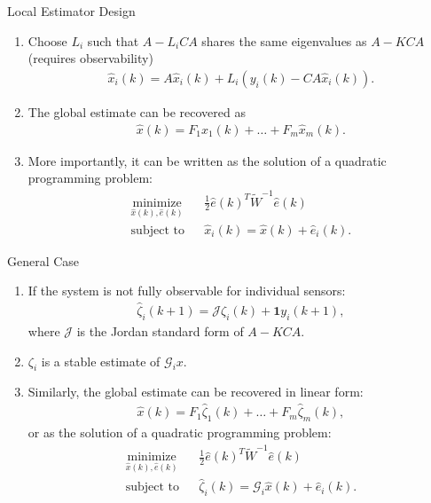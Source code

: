\documentclass[10pt]{beamer}
\begin{document}
\begin{frame}{Local Estimator Design}
  \begin{enumerate}
  \item  Choose $L_i$ such that $A-L_iCA$ shares the same eigenvalues as $A-KCA$ (requires observability)
    \begin{align*}
      \hat x_i(k) = A \hat x_i(k) + L_i (y_i(k)-CA\hat x_i(k)).
    \end{align*}  
  \item The global estimate can be recovered as
    \begin{align*}
      \hat x(k) = F_1\hat x_1(k)+\dots+F_m\hat x_m(k).
    \end{align*}
  \item More importantly, it can be written as the solution of a quadratic programming problem:
    \begin{align*}
      &\mathop{\textrm{minimize}}\limits_{\hat x(k),\hat e(k)}&
      & \frac{1}{2}\hat e(k)^T \tilde W^{-1} \hat e(k)\\
      &\textrm{subject to} &
      &\hat x_i(k)  =  \hat x(k) + \hat e_i(k).&
    \end{align*}
  \end{enumerate}
\end{frame}

\begin{frame}{General Case}
  \begin{enumerate}
  \item If the system is not fully observable for individual sensors:
    \begin{align*}
      \hat \zeta_i(k+1) = \mathcal J \zeta_i(k) + \mathbf 1 y_i(k+1),
    \end{align*}  
    where $\mathcal J$ is the Jordan standard form of $A-KCA$.
  \item $\zeta_i$ is a stable estimate of $\mathcal G_i x$. 
  \item Similarly, the global estimate can be recovered in linear form:
    \begin{align*}
      \hat x(k) = F_1\hat \zeta_1(k)+\dots+F_m\hat \zeta_m(k),
    \end{align*}
    or as the solution of a quadratic programming problem:
    \begin{align*}
      &\mathop{\textrm{minimize}}\limits_{\hat x(k),\hat e(k)}&
      & \frac{1}{2}\hat e(k)^T \tilde W^{-1} \hat e(k)\\
      &\textrm{subject to} &
      &\hat \zeta_i(k)  = \mathcal G_i \hat x(k) + \hat e_i(k).&
    \end{align*}
  \end{enumerate}
\end{frame}
\end{document}
